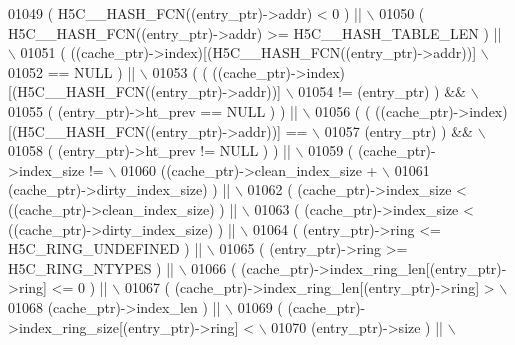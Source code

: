 \begin{DoxyCode}
01049 \textcolor{preprocessor}{     ( H5C\_\_HASH\_FCN((entry\_ptr)->addr) < 0 ) ||                        \(\backslash\)}
01050 \textcolor{preprocessor}{     ( H5C\_\_HASH\_FCN((entry\_ptr)->addr) >= H5C\_\_HASH\_TABLE\_LEN ) ||     \(\backslash\)}
01051 \textcolor{preprocessor}{     ( ((cache\_ptr)->index)[(H5C\_\_HASH\_FCN((entry\_ptr)->addr))]         \(\backslash\)}
01052 \textcolor{preprocessor}{       == NULL ) ||                                                     \(\backslash\)}
01053 \textcolor{preprocessor}{     ( ( ((cache\_ptr)->index)[(H5C\_\_HASH\_FCN((entry\_ptr)->addr))]       \(\backslash\)}
01054 \textcolor{preprocessor}{       != (entry\_ptr) ) &&                                              \(\backslash\)}
01055 \textcolor{preprocessor}{       ( (entry\_ptr)->ht\_prev == NULL ) ) ||                            \(\backslash\)}
01056 \textcolor{preprocessor}{     ( ( ((cache\_ptr)->index)[(H5C\_\_HASH\_FCN((entry\_ptr)->addr))] ==    \(\backslash\)}
01057 \textcolor{preprocessor}{         (entry\_ptr) ) &&                                               \(\backslash\)}
01058 \textcolor{preprocessor}{       ( (entry\_ptr)->ht\_prev != NULL ) ) ||                            \(\backslash\)}
01059 \textcolor{preprocessor}{     ( (cache\_ptr)->index\_size !=                                       \(\backslash\)}
01060 \textcolor{preprocessor}{       ((cache\_ptr)->clean\_index\_size +                                 \(\backslash\)}
01061 \textcolor{preprocessor}{    (cache\_ptr)->dirty\_index\_size) ) ||                             \(\backslash\)}
01062 \textcolor{preprocessor}{     ( (cache\_ptr)->index\_size < ((cache\_ptr)->clean\_index\_size) ) ||   \(\backslash\)}
01063 \textcolor{preprocessor}{     ( (cache\_ptr)->index\_size < ((cache\_ptr)->dirty\_index\_size) ) ||   \(\backslash\)}
01064 \textcolor{preprocessor}{     ( (entry\_ptr)->ring <= H5C\_RING\_UNDEFINED ) ||                     \(\backslash\)}
01065 \textcolor{preprocessor}{     ( (entry\_ptr)->ring >= H5C\_RING\_NTYPES ) ||                        \(\backslash\)}
01066 \textcolor{preprocessor}{     ( (cache\_ptr)->index\_ring\_len[(entry\_ptr)->ring] <= 0 ) ||         \(\backslash\)}
01067 \textcolor{preprocessor}{     ( (cache\_ptr)->index\_ring\_len[(entry\_ptr)->ring] >                 \(\backslash\)}
01068 \textcolor{preprocessor}{       (cache\_ptr)->index\_len ) ||                                      \(\backslash\)}
01069 \textcolor{preprocessor}{     ( (cache\_ptr)->index\_ring\_size[(entry\_ptr)->ring] <                \(\backslash\)}
01070 \textcolor{preprocessor}{       (entry\_ptr)->size ) ||                                           \(\backslash\)}

\end{DoxyCode}
